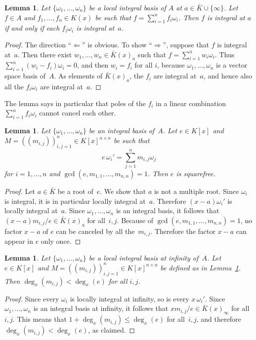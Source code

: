 \documentclass{sig-alternate}
\newtheorem{lemma}[theorem]{Lemma}
\begin{document}
\begin{lemma}\label{lemma:1}
  Let $\{\omega_1,\dots,\omega_n\}$ be a local integral basis of $A$ at $a\in\bar K\cup\{\infty\}$.
  Let $f\in A$ and $f_1,\dots,f_n\in K(x)$ be such that $f=\sum_{i=1}^nf_i\omega_i$.
  Then $f$ is integral at $a$ if and only if each $f_i\omega_i$ is integral at~$a$.
\end{lemma}
\begin{proof}
  The direction ``$\Leftarrow$'' is obvious. To show ``$\Rightarrow$'', suppose
  that $f$ is integral at~$a$. Then there exist $w_1,\dots,w_n\in\bar K(x)_a$ such that
  $f=\sum_{i=1}^nw_i\omega_i$. Thus $\sum_{i=1}^n(w_i-f_i)\omega_i=0$, and then
  $w_i=f_i$ for all $i$, because $\omega_1,\dots,\omega_n$ is a vector space basis of~$A$.
  As elements of $\bar K(x)_a$, the $f_i$ are integral at~$a$, and hence also all the $f_i\omega_i$
  are integral at~$a$.
\end{proof}

The lemma says in particular that poles of the $f_i$ in a linear combination
$\sum_{i=1}^n f_i\omega_i$ cannot cancel each other.

\begin{lemma}\label{lemma:e}
  Let $\{\omega_1,\dots,\omega_n\}$ be an integral basis of~$A$.
  Let $e\in K[x]$ and
  $M=((m_{i,j}))_{i,j=1}^n\in K[x]^{n\times n}$ be such that
  \[
    e\,\omega_i'=\sum_{j=1}^n m_{i,j}\omega_j
  \]
  for $i=1,\dots,n$ and $\gcd(e,m_{1,1},\dots,m_{n,n})=1$.
  Then $e$ is squarefree.
\end{lemma}
\begin{proof}
  Let $a\in\bar K$ be a root of~$e$. We show that $a$ is not a multiple root.
  Since $\omega_i$ is integral, it is in particular locally integral at~$a$.
  Therefore $(x-a)\omega_i'$ is locally integral at~$a$.
  Since $\omega_1,\dots,\omega_n$ is an integral basis, it follows that
  $(x-a)m_{i,j}/e\in\bar K(x)_a$ for all~$i,j$.
  Because of $\gcd(e,m_{1,1},\dots,m_{n,n})=1$, no factor $x-a$ of $e$
  can be canceled by all the~$m_{i,j}$.
  Therefore the factor $x-a$ can appear in $e$ only once.
\end{proof}

\begin{lemma} \label{lemma:degM}
  Let $\{\omega_1,\dots,\omega_n\}$ be a local integral basis at infinity of~$A$.
  Let $e\in K[x]$ and $M=((m_{i,j}))_{i,j=1}^n\in K[x]^{n\times n}$
  be defined as in Lemma~\ref{lemma:e}. Then $\deg_x(m_{i,j})<\deg_x(e)$ for all $i,j$.
\end{lemma}
\begin{proof}
  Since every $\omega_i$ is locally integral at infinity, so is every $x\,\omega_i'$.
  Since $\omega_1,\dots,\omega_n$ is an integral basis at infinity, it follows that
  $xm_{i,j}/e\in\bar K(x)_\infty$ for all~$i,j$. This means that $1+\deg_x(m_{i,j})\leq\deg_x(e)$
  for all~$i,j$, and therefore $\deg_x(m_{i,j})<\deg_x(e)$, as claimed.
\end{proof}
\end{document}
